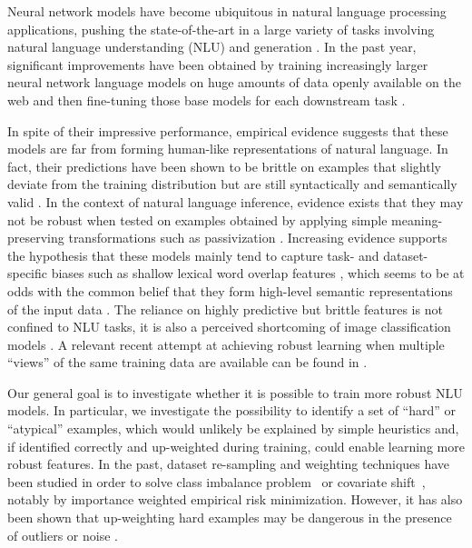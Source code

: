 
Neural network models have become ubiquitous in natural language processing applications, pushing the state-of-the-art in a large variety of tasks involving natural language understanding (NLU) and generation \cite{wu2016google,wang2019superglue}.
In the past year, significant improvements have been obtained by  training increasingly larger neural network language models on huge amounts of data openly available on the web and then fine-tuning those base models for each downstream task \cite{devlin2018bert,peters2018deep,liu2019multi}.

In spite of their impressive performance, empirical evidence suggests that these models are far from forming human-like representations of natural language. In fact, their predictions have been shown to be brittle on examples that slightly deviate from the training distribution but are still syntactically and semantically valid \cite{jia2017adversarial,linzen2019right}. In the context of natural language inference, evidence exists that they may not be robust when tested on examples obtained by applying simple meaning-preserving transformations such as passivization \cite{dasgupta2018evaluating}.
Increasing evidence supports the hypothesis that these models mainly tend to capture task- and dataset-specific biases such as shallow lexical word overlap features \cite{poliak2018hypothesis,dasgupta2018evaluating,linzen2019right,clark2019dont}, which seems to be at odds with the common belief that they form high-level semantic representations of the input data \cite{bengio2009learning}. The reliance on highly predictive but brittle features is not confined to NLU tasks, it is also a perceived shortcoming of image classification models \cite{brendel2019approximating,geirhos2018imagenet,jacobsen2018excessive}. A relevant recent attempt at achieving robust learning when multiple ``views'' of the same training data are available can be found in .

Our general goal is to investigate whether it is possible to train more robust NLU models. In particular, we investigate the possibility to identify a set of ``hard'' or ``atypical'' examples, which would unlikely be explained by simple heuristics and, if identified correctly and up-weighted during training, could enable learning more robust features. In the past, dataset re-sampling and weighting techniques have been studied in order to solve class imbalance problem~\cite{chawla2002smote} or covariate shift~\cite{sugiyama2007covariate}, notably by importance weighted empirical risk minimization. However, it has also been shown that up-weighting hard examples may be dangerous in the presence of outliers or noise \cite{chapelle2007training,Kumar10,toneva2018empirical}.


